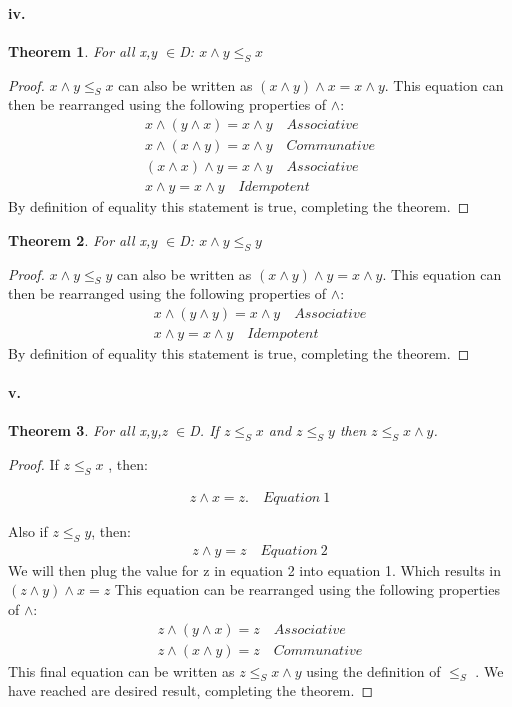 \documentclass[10pt,letter]{article}
\newtheorem*{thm}{Theorem}
\begin{document}
\paragraph{iv.}
\begin{thm} 
For all x,y $\in$D: $x \wedge y \le_S x$
\end{thm} 
\begin{proof}
$x \wedge y \le_S x$ can also be written as $(x \wedge y) \wedge x = x \wedge y$. This equation can then be rearranged using the following properties of $\wedge$:
\begin{align*}
x \wedge (y \wedge x) = x \wedge y \quad Associative\\	
x \wedge (x \wedge y) = x \wedge y \quad Communative\\
(x \wedge x) \wedge y = x \wedge y \quad Associative\\
 x \wedge y = x \wedge y	\quad Idempotent		
\end{align*}
By definition of equality this statement is true, completing the theorem. 
\end{proof} 
\begin{thm} 
For all x,y $\in$D:  $x \wedge y \le_S y$
\end{thm} 
\begin{proof}
$x \wedge y \le_S y$ can also be written as $(x \wedge y) \wedge y = x \wedge y$. This equation can then be rearranged using the following properties of $\wedge$:
\begin{align*}
x \wedge (y \wedge y) = x \wedge y \quad Associative\\	
x \wedge y = x \wedge y \quad Idempotent	
\end{align*}
By definition of equality this statement is true, completing the theorem. 
\end{proof}

\paragraph{v.}
\begin{thm} 
For all x,y,z $\in$D. If $z \le_S x$ and  $z \le_S y$ then $z \le_S x \wedge y$.
\end{thm}
\begin{proof}
If $z \le_S x$ , then:

\begin{align*}
z \wedge x = z.	\quad Equation \>1
\end{align*}

Also if $z \le_S y$, then:
\begin{align*}
z \wedge y = z \quad Equation \> 2
\end{align*}
We will then plug the value for z in equation 2 into equation 1. Which results in $(z \wedge y) \wedge x = z$ This equation can be rearranged using the following properties of $\wedge$:
\begin{align*}
z \wedge (y \wedge x) = z \quad Associative\\ 
z \wedge (x \wedge y) = z \quad Communative
\end{align*}
This final equation can be written as $z \le_S x \wedge y$ using the definition of $\le_S$ . We have reached are desired result, completing the theorem. 
\end{proof}
\end{document}

